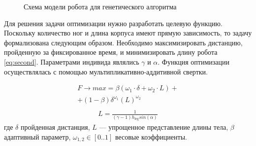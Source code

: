 \begin{figure}[H]
    \centering
    \caption{Схема модели робота для генетического алгоритма}
    \label{fig:best_gen_robot.jpg}
\end{figure}

Для решения задачи оптимизации нужно разработать целевую функцию. Поскольку количество ног и длина корпуса имеют прямую зависимость, то задачу формализована следующим образом. Необходимо максимизировать дистанцию, пройденную за фиксированное время, и минимизировать длину робота \eqref{eq:second}. Параметрами индивида являлись $\gamma$ и $\alpha$. Функция оптимизации осуществлялась с помощью мультипликативно-аддитивной свертки.

\begin{eqnarray}
    \label{eq:second}
    F \rightarrow max = \beta \left( {\omega}_{1} \cdot \delta + {\omega}_{2} \cdot L\right) + \\ \nonumber + (1 - \beta) {\delta}^{{\omega}_{1}} {\left( L\right)}^{{\omega}_{2}} \\
\end{eqnarray}
\begin{align}
    L = \frac{1}{(\gamma - 1) h_{\text{leg}}sin(\alpha)}
\end{align}
где $\delta$ пройденная дистанция, $L$ --- упрощенное представление длины тела, $\beta$ адаптивный параметр, ${\omega}_{1,2} \in  [ 0..1 ] $ весовые коэффициенты.

